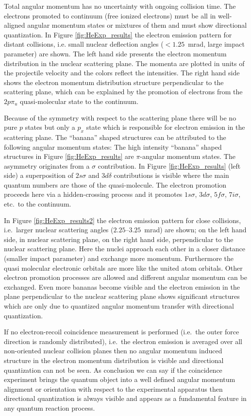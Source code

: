 \documentclass{article}
\begin{document}
Total angular momentum has no uncertainty with ongoing collision time. The electrons promoted to continuum (free ionized electrons) must be all in well-aligned angular momentum states or mixtures of them and must show directional quantization. In Figure \ref{fig:HeExp_results} the electron emission pattern for distant collisions, i.e. small nuclear deflection angles ($<1.25$~mrad, large impact parameter) are shown. The left hand side presents the electron momentum distribution in the nuclear scattering plane. The momenta are plotted in units of the projectile velocity and the colors reflect the intensities. The right hand side shows the electron momentum distribution structure perpendicular to the scattering plane, which can be explained by the promotion of electrons from the $2p{\pi}_u$ quasi-molecular state to the continuum.
      
Because of the symmetry with respect to the scattering plane there will be no pure $p$ states but only a $p_x$ state which is responsible for electron emission in the scattering plane. The ``banana'' shaped structures can be attributed to the following angular momentum states: The high intensity ``banana'' shaped structures in Figure \ref{fig:HeExp_results} are $\pi$-angular momentum states. The asymmetry originates from a $\sigma$ contribution. In Figure \ref{fig:HeExp_results} (left side) a superposition of $2s\sigma$ and $3d\delta$ contributions is visible where the main quantum numbers are those of the quasi-molecule. The electron promotion proceeds here via a hidden-crossing process and it promotes $1s\sigma$, $3d\sigma$, $5f\sigma$, $7i\sigma$, etc.\ to the continuum.     
      
In Figure \ref{fig:HeExp_results2} the electron emission pattern for close collisions, i.e.\ larger nuclear scattering angles ($2.25$--$3.25$~mrad) are shown; on the left hand side, in nuclear scattering plane, on the right hand side, perpendicular to the nuclear scattering plane. Here the nuclei approach each other in a closer distance (smaller impact parameter) and exchange more momentum. Furthermore the quasi molecular electronic orbitals are more like the united atom orbitals. Other electron promotion processes are allowed and different angular momentum can be exchanged. Even more bananas become visible and the electron emission in the plane perpendicular to the nuclear scattering plane shows significant structures which are only due to quantized angular momentum transfer with directional quantization. 
      
If no electron-recoil coincidence measurement is performed (i.e.\ the outer force direction is randomly distributed), i.e.\ the electron emission is averaged over all non-oriented nuclear collision planes then  no angular momentum induced structure in the electron momentum distribution is visible and directional quantization can not be seen.  As conclusion we can say if the coincidence experiment brings the quantum object into a well defined angular momentum alignment or orientation with respect to the experimental apparatus then directional quantization is always visible and appears as a fundamental feature in any quantum reaction process. 
\end{document}
